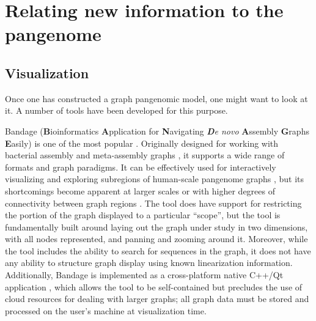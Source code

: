 \section{Relating new information to the pangenome}

\subsection{Visualization}

Once one has constructed a graph pangenomic model, one might want to look at it.
A number of tools have been developed for this purpose.

Bandage (\textbf{B}ioinformatics \textbf{A}pplication for \textbf{N}avigating \textit{\textbf{D}e novo} \textbf{A}ssembly \textbf{G}raphs \textbf{E}asily) \citep{Wick_2015} is one of the most popular \citep{Mikheenko_2019}.
Originally designed for working with bacterial assembly and meta-assembly graphs \citep{Wick_2015}, it supports a wide range of formats and graph  paradigms.
It can be effectively used for interactively visualizing and exploring subregions of human-scale pangenome graphs \citep{Garrison_2019}, but its shortcomings become apparent at larger scales or with higher degrees of connectivity between graph regions \citep{Mikheenko_2019}.
The tool does have support for restricting the portion of the graph displayed to a particular ``scope'', but the tool is fundamentally built around laying out the graph under study in two dimensions, with all nodes represented, and panning and zooming around it.
Moreover, while the tool includes the ability to search for sequences in the graph, it does not have any ability to structure graph display using known linearization information.
Additionally, Bandage is implemented as a cross-platform native C++/Qt application \citep{Wick_2015}, which allows the tool to be self-contained but precludes the use of cloud resources for dealing with larger graphs; all graph data must be stored and processed on the user's machine at visualization time.


